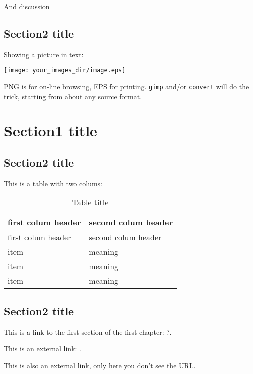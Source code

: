 And discussion

\subsection{Section2 title}\label{sectux5f02ux5f01ux5f02}

Showing a picture in text:

\texttt{[image: your\_images\_dir/image.eps]}

PNG is for on-line browsing, EPS for printing. \texttt{gimp} and/or
\texttt{convert} will do the trick, starting from about any source
format.

\section{Section1 title}\label{sectux5f02ux5f02}

\subsection{Section2 title}\label{sectux5f02ux5f02ux5f01}

This is a table with two colums:

\begin{longtable}[c]{@{}ll@{}}
\caption{Table title}\tabularnewline
\toprule
first colum header & second colum header\tabularnewline
\midrule
\endfirsthead
\toprule
first colum header & second colum header\tabularnewline
\midrule
\endhead
item & meaning\tabularnewline
item & meaning\tabularnewline
item & meaning\tabularnewline
\bottomrule
\end{longtable}

\subsection{Section2 title}\label{sectux5f02ux5f02ux5f02}

This is a link to the first section of the first chapter: ?.

This is an external link: \href{http://www.somewhere.org}{}.

This is also \href{http://www.somewhere.org}{an external link}, only
here you don't see the URL.
